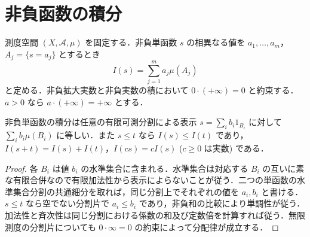 \section{非負函数の積分}
\begin{defn}[非負単函数の積分]
測度空間 $(X,\mathcal A,\mu)$ を固定する．非負単函数 $s$ の相異なる値を $a_1,\ldots,a_m$，$A_j=\{s=a_j\}$ とするとき
\[
 I(s)=\sum_{j=1}^m a_j\mu(A_j)
\]
と定める．非負拡大実数と非負実数の積において $0\cdot(+\infty)=0$ と約束する．$a>0$ なら $a\cdot(+\infty)=+\infty$ とする．
\end{defn}
\begin{prop}[単函数積分の基本性質]
非負単函数の積分は任意の有限可測分割による表示 $s=\sum_i b_i1_{B_i}$ に対して $\sum_i b_i\mu(B_i)$ に等しい．また $s\leq t$ なら $I(s)\leq I(t)$ であり，$I(s+t)=I(s)+I(t)$，$I(cs)=cI(s)$ ($c\geq0$ は実数) である．
\end{prop}
\begin{proof}
各 $B_i$ は値 $b_i$ の水準集合に含まれる．水準集合は対応する $B_i$ の互いに素な有限合併なので有限加法性から表示によらないことが従う．二つの単函数の水準集合分割の共通細分を取れば，同じ分割上でそれぞれの値を $a_i,b_i$ と書ける．$s\leq t$ なら空でない分割片で $a_i\leq b_i$ であり，非負和の比較により単調性が従う．加法性と斉次性は同じ分割における係数の和及び定数倍を計算すれば従う．無限測度の分割片についても $0\cdot\infty=0$ の約束によって分配律が成立する．
\end{proof}
